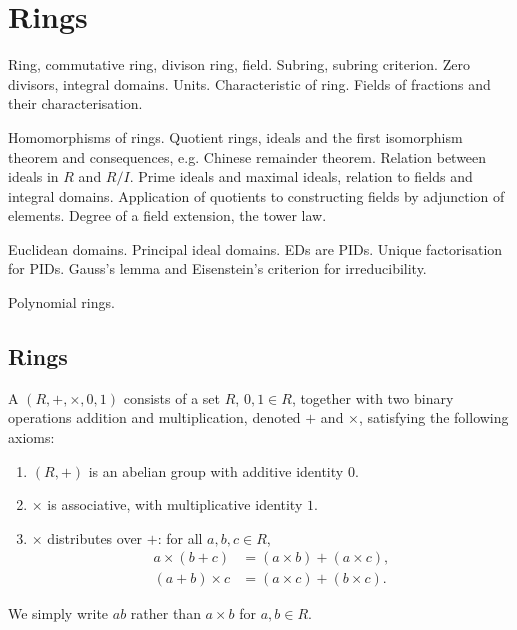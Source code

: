 \chapter{Rings}\label{chap:rings}
\begin{summary}
\item Ring, commutative ring, divison ring, field. Subring, subring criterion. Zero divisors, integral domains. Units. Characteristic of ring. Fields of fractions and their characterisation.
\item Homomorphisms of rings. Quotient rings, ideals and the first isomorphism theorem and consequences, e.g. Chinese remainder theorem. Relation between ideals in $R$ and $R/I$. Prime ideals and maximal ideals, relation to fields and integral domains. Application of quotients to constructing fields by adjunction of elements. Degree of a field extension, the tower law.
\item Euclidean domains. Principal ideal domains. EDs are PIDs. Unique factorisation for PIDs. Gauss's lemma and Eisenstein's criterion for irreducibility.
\item Polynomial rings.
\end{summary}

\section{Rings}
\begin{definition}[Ring]
A  $(R,+,\times,0,1)$ consists of a set $R$, $0,1\in R$, together with two binary operations addition and multiplication, denoted $+$ and $\times$, satisfying the following axioms:
\begin{enumerate}[label=(\roman*)]
\item $(R,+)$ is an abelian group with additive identity $0$.
\item $\times$ is associative, with multiplicative identity $1$.
\item $\times$ distributes over $+$: for all $a,b,c\in R$,
\begin{align*}
a\times(b+c)&=(a\times b)+(a\times c),\\
(a+b)\times c&=(a\times c)+(b\times c).
\end{align*}
\end{enumerate}
\end{definition}

\begin{notation}
We simply write $ab$ rather than $a\times b$ for $a,b\in R$.
\end{notation}

